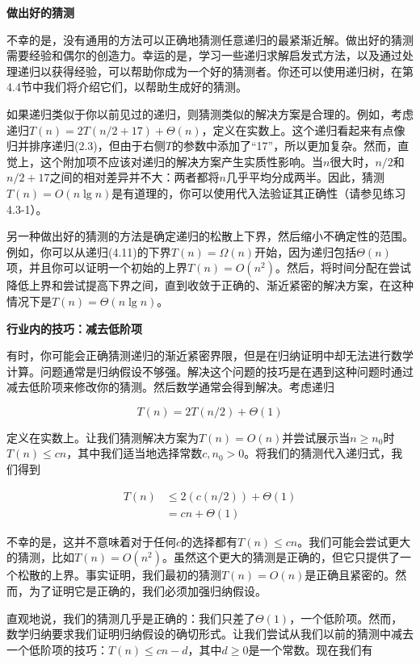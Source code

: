\documentclass[lang=cn,newtx,10pt,scheme=chinese]{elegantbook}
\begin{document}
\textbf{做出好的猜测}

不幸的是，没有通用的方法可以正确地猜测任意递归的最紧渐近解。做出好的猜测需要经验和偶尔的创造力。幸运的是，学习一些递归求解启发式方法，以及通过处理递归以获得经验，可以帮助你成为一个好的猜测者。你还可以使用递归树，在第4.4节中我们将介绍它们，以帮助生成好的猜测。

如果递归类似于你以前见过的递归，则猜测类似的解决方案是合理的。例如，考虑递归$T(n)=2 T(n / 2+17)+\Theta(n)$，定义在实数上。这个递归看起来有点像归并排序递归(2.3)，但由于右侧$T$的参数中添加了“17”，所以更加复杂。然而，直觉上，这个附加项不应该对递归的解决方案产生实质性影响。当$n$很大时，$n / 2$和$n / 2+17$之间的相对差异并不大：两者都将$n$几乎平均分成两半。因此，猜测$T(n)=O(n \lg n)$是有道理的，你可以使用代入法验证其正确性（请参见练习4.3-1）。

另一种做出好的猜测的方法是确定递归的松散上下界，然后缩小不确定性的范围。例如，你可以从递归(4.11)的下界$T(n)=\Omega(n)$开始，因为递归包括$\Theta(n)$项，并且你可以证明一个初始的上界$T(n)=O\left(n^2\right)$。然后，将时间分配在尝试降低上界和尝试提高下界之间，直到收敛于正确的、渐近紧密的解决方案，在这种情况下是$T(n)=\Theta(n \lg n)$。

\textbf{行业内的技巧：减去低阶项}

有时，你可能会正确猜测递归的渐近紧密界限，但是在归纳证明中却无法进行数学计算。问题通常是归纳假设不够强。解决这个问题的技巧是在遇到这种问题时通过减去低阶项来修改你的猜测。然后数学通常会得到解决。考虑递归

$$
T(n)=2 T(n / 2)+\Theta(1)
$$

定义在实数上。让我们猜测解决方案为$T(n)=O(n)$并尝试展示当$n \geq n_0$时$T(n) \leq c n$，其中我们适当地选择常数$c, n_0>0$。将我们的猜测代入递归式，我们得到

$$
\begin{aligned}
T(n) & \leq 2(c(n / 2))+\Theta(1) \\
& =c n+\Theta(1)
\end{aligned}
$$

不幸的是，这并不意味着对于任何$c$的选择都有$T(n) \leq c n$。我们可能会尝试更大的猜测，比如$T(n)=O\left(n^2\right)$。虽然这个更大的猜测是正确的，但它只提供了一个松散的上界。事实证明，我们最初的猜测$T(n)=O(n)$是正确且紧密的。然而，为了证明它是正确的，我们必须加强归纳假设。

直观地说，我们的猜测几乎是正确的：我们只差了$\Theta(1)$，一个低阶项。然而，数学归纳要求我们证明归纳假设的确切形式。让我们尝试从我们以前的猜测中减去一个低阶项的技巧：$T(n) \leq c n-d$，其中$d \geq 0$是一个常数。现在我们有
\end{document}
